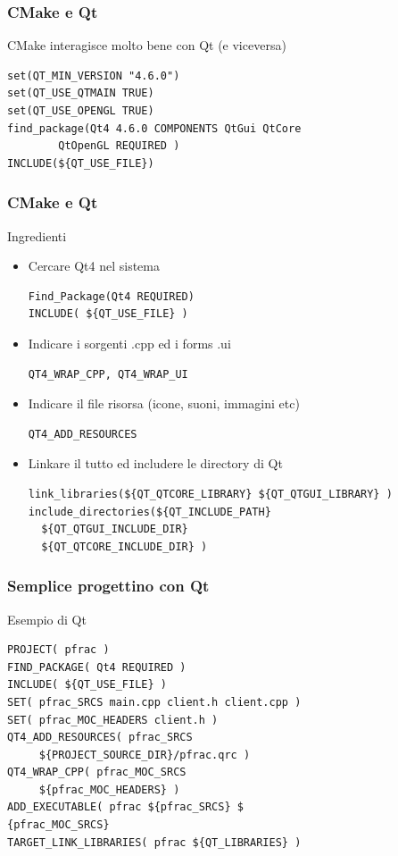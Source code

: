 \documentclass[10pt] {beamer}
\begin{document}
\begin{frame}[fragile]
\frametitle{CMake e Qt}
CMake interagisce molto bene con Qt (e viceversa)
\begin{footnotesize}
\begin{verbatim}
set(QT_MIN_VERSION "4.6.0")
set(QT_USE_QTMAIN TRUE)
set(QT_USE_OPENGL TRUE)
find_package(Qt4 4.6.0 COMPONENTS QtGui QtCore 
	    QtOpenGL REQUIRED )
INCLUDE(${QT_USE_FILE})
\end{verbatim}
\end{footnotesize}
\end{frame}


\begin{frame}[fragile]
 \frametitle{CMake e Qt}
\begin{block}{Ingredienti}

\begin{itemize} 
\item <1-> Cercare Qt4 nel sistema
\begin{verbatim}
Find_Package(Qt4 REQUIRED)
INCLUDE( ${QT_USE_FILE} )
\end{verbatim}
\item <2-> Indicare i sorgenti .cpp ed i forms .ui
\begin{verbatim}
QT4_WRAP_CPP, QT4_WRAP_UI 
\end{verbatim}
\item <3-> Indicare il file risorsa (icone, suoni, immagini etc)
\begin{verbatim}
QT4_ADD_RESOURCES
\end{verbatim}
\item<4-> Linkare il tutto ed includere le directory di Qt
\begin{small}
\begin{verbatim}
link_libraries(${QT_QTCORE_LIBRARY} ${QT_QTGUI_LIBRARY} )
include_directories(${QT_INCLUDE_PATH} 
  ${QT_QTGUI_INCLUDE_DIR}
  ${QT_QTCORE_INCLUDE_DIR} )
\end{verbatim}
\end{small}
\end{itemize}

\end{block}
\end{frame}

\begin{frame}[fragile]
 \frametitle{Semplice progettino con Qt}
\begin{block}{Esempio di Qt}
 \begin{small}
\begin{verbatim}
PROJECT( pfrac )
FIND_PACKAGE( Qt4 REQUIRED )
INCLUDE( ${QT_USE_FILE} )
SET( pfrac_SRCS main.cpp client.h client.cpp )
SET( pfrac_MOC_HEADERS client.h )
QT4_ADD_RESOURCES( pfrac_SRCS 
     ${PROJECT_SOURCE_DIR}/pfrac.qrc )
QT4_WRAP_CPP( pfrac_MOC_SRCS 
     ${pfrac_MOC_HEADERS} )
ADD_EXECUTABLE( pfrac ${pfrac_SRCS} $
{pfrac_MOC_SRCS} 
TARGET_LINK_LIBRARIES( pfrac ${QT_LIBRARIES} )
\end{verbatim}
\end{small}
\end{block}

\end{frame}
\end{document}
